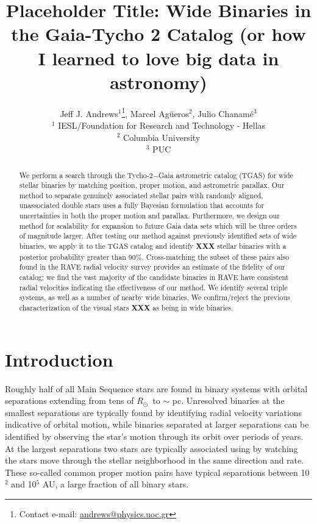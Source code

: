 \documentclass[usenatbib]{mnras}
\title[Gaia wide binaries]{Placeholder Title: Wide Binaries in the Gaia-Tycho 2 Catalog (or how I learned to love big data in astronomy)}
\author[J. J. Andrews et al.]{Jeff J. Andrews$^{1}$\thanks{Contact e-mail: \href{mailto:andrews@physics.uoc.gr}{andrews@physics.uoc.gr}}, Marcel Ag\"{u}eros$^2$, Julio Chanam\'{e}$^3$ \\
$^1$ IESL/Foundation for Research and Technology - Hellas \\
$^2$ Columbia University \\
$^3$ PUC}
\newcommand{\Rsun}{\ifmmode {R_{\odot}}\else${R_{\odot}}$\fi}
\begin{document}
\label{firstpage}
\pagerange{\pageref{firstpage}--\pageref{lastpage}}
\maketitle



\begin{abstract}
We perform a search through the Tycho-2$-$Gaia astrometric catalog (TGAS) for wide stellar binaries by matching position, proper motion, and astrometric parallax. Our method to separate genuinely associated stellar pairs with randomly aligned, unassociated double stars uses a fully Bayesian formulation that accounts for uncertainties in both the proper motion and parallax. Furthermore, we design our method for scalability for expansion to future Gaia data sets which will be three orders of magnitude larger. After testing our method against previously identified sets of wide binaries, we apply it to the TGAS catalog and identify {\bf XXX} stellar binaries with a posterior probability greater than 90\%. Cross-matching the subset of these pairs also found in the RAVE radial velocity survey provides an estimate of the fidelity of our catalog; we find the vast majority of the candidate binaries in RAVE have consistent radial velocities indicating the effectiveness of our method. We identify several triple systems, as well as a number of nearby wide binaries. We confirm/reject the previous characterization of the visual stars {\bf XXX} as being in wide binaries.
\end{abstract}


\section{Introduction}

Roughly half of all Main Sequence stars are found in binary systems with orbital separations extending from tens of \Rsun\ to $\sim$ pc. Unresolved binaries at the smallest separations are typically found by identifying radial velocity variations indicative of orbital motion, while binaries separated at larger separations can be identified by observing the star's motion through its orbit over periods of years. At the largest separations two stars are typically associated using by watching the stars move through the stellar neighborhood in the same direction and rate. These so-called common proper motion pairs have typical separations between 10$^2$ and 10$^5$ AU, a large fraction of all binary stars.
\end{document}
